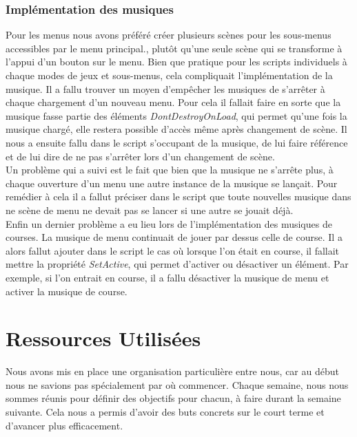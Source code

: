 \documentclass[12pt,a4paper]{article}
\begin{document}
            \subsubsection{Implémentation des musiques}
                Pour les menus nous avons préféré créer plusieurs scènes pour les sous-menus accessibles
                par le menu principal., plutôt qu'une seule scène qui se transforme à l'appui d'un 
                bouton sur le menu.
                Bien que pratique pour les scripts individuels à chaque modes de jeux et sous-menus,
                cela compliquait l'implémentation de la musique. Il a fallu trouver un moyen d'empêcher
                les musiques de s'arrêter à chaque chargement d'un nouveau menu. Pour cela il
                fallait faire en sorte que la musique fasse partie des éléments
                \textit{DontDestroyOnLoad}, qui permet qu'une fois la musique chargé, elle restera 
                possible d'accès
                même après changement de scène. Il nous a ensuite fallu dans le script s'occupant de la 
                musique, de lui faire référence et de lui dire de ne pas s'arrêter lors d'un changement
                de scène.\\
                Un problème qui a suivi est le fait que bien que la musique ne s'arrête plus, à chaque
                ouverture d'un menu une autre instance de la musique se lançait. Pour remédier à cela il
                a fallut préciser dans le script que toute nouvelles musique dans ne scène de menu ne
                devait pas se lancer si une autre se jouait déjà.\\
                Enfin un dernier problème a eu lieu lors de l'implémentation des musiques de courses. La
                musique de menu continuait de jouer par dessus celle de course. Il a alors fallut
                ajouter dans le script le cas où lorsque l'on était en course, il fallait mettre la 
                propriété \textit{SetActive}, qui permet d'activer ou désactiver un élément. Par 
                exemple, si l'on entrait en course, il a fallu désactiver la musique de menu et activer 
                la musique de course.

    \clearpage
    \section{Ressources Utilisées}
        Nous avons mis en place une organisation particulière entre nous,
        car au début nous ne savions pas spécialement par où commencer.
        Chaque semaine, nous nous sommes réunis pour définir des 
        objectifs pour chacun, à faire durant la semaine suivante. Cela nous
        a permis d'avoir des buts concrets sur le court terme et d'avancer plus efficacement.
\end{document}
